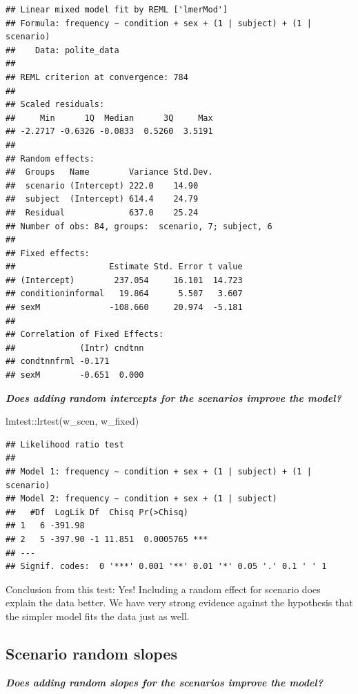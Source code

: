 \documentclass[
  openany]{book}
\newenvironment{Shaded}{\begin{snugshade}}{\end{snugshade}}
\newcommand{\FunctionTok}[1]{\textcolor[rgb]{0.00,0.00,0.00}{#1}}
\newcommand{\NormalTok}[1]{#1}
\newcommand{\SpecialCharTok}[1]{\textcolor[rgb]{0.00,0.00,0.00}{#1}}
\begin{document}
\begin{verbatim}
## Linear mixed model fit by REML ['lmerMod']
## Formula: frequency ~ condition + sex + (1 | subject) + (1 | scenario)
##    Data: polite_data
## 
## REML criterion at convergence: 784
## 
## Scaled residuals: 
##     Min      1Q  Median      3Q     Max 
## -2.2717 -0.6326 -0.0833  0.5260  3.5191 
## 
## Random effects:
##  Groups   Name        Variance Std.Dev.
##  scenario (Intercept) 222.0    14.90   
##  subject  (Intercept) 614.4    24.79   
##  Residual             637.0    25.24   
## Number of obs: 84, groups:  scenario, 7; subject, 6
## 
## Fixed effects:
##                   Estimate Std. Error t value
## (Intercept)        237.054     16.101  14.723
## conditioninformal   19.864      5.507   3.607
## sexM              -108.660     20.974  -5.181
## 
## Correlation of Fixed Effects:
##             (Intr) cndtnn
## condtnnfrml -0.171       
## sexM        -0.651  0.000
\end{verbatim}

\textbf{\emph{Does adding random intercepts for the scenarios improve the model?}}

\begin{Shaded}
\begin{Highlighting}[]
\NormalTok{lmtest}\SpecialCharTok{::}\FunctionTok{lrtest}\NormalTok{(w\_scen, w\_fixed)}
\end{Highlighting}
\end{Shaded}

\begin{verbatim}
## Likelihood ratio test
## 
## Model 1: frequency ~ condition + sex + (1 | subject) + (1 | scenario)
## Model 2: frequency ~ condition + sex + (1 | subject)
##   #Df  LogLik Df  Chisq Pr(>Chisq)    
## 1   6 -391.98                         
## 2   5 -397.90 -1 11.851  0.0005765 ***
## ---
## Signif. codes:  0 '***' 0.001 '**' 0.01 '*' 0.05 '.' 0.1 ' ' 1
\end{verbatim}

Conclusion from this test: Yes! Including a random effect for scenario does explain the data better. We have very strong evidence against the hypothesis that the simpler model fits the data just as well.

\hypertarget{scenario-random-slopes}{%
\subsection{Scenario random slopes}\label{scenario-random-slopes}}

\textbf{\emph{Does adding random slopes for the scenarios improve the model?}}
\end{document}
